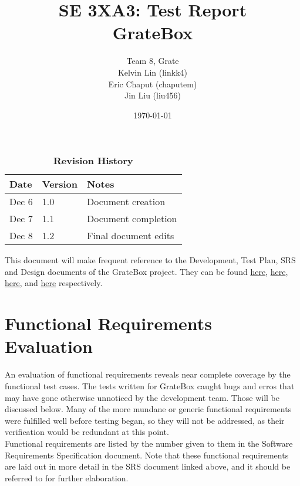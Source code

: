 \documentclass[12pt, titlepage]{article}
\title{SE 3XA3: Test Report\\GrateBox}
\author{Team 8, Grate
		\\ Kelvin Lin (linkk4)
		\\ Eric Chaput (chaputem)
		\\ Jin Liu (liu456)
}
\date{\today}
\begin{document}
\maketitle

\tableofcontents
\listoftables
\listoffigures

\begin{table}[h]
\caption{\bf Revision History}
\begin{tabularx}{\textwidth}{p{3cm}p{2cm}X}
\toprule {\bf Date} & {\bf Version} & {\bf Notes}\\
\midrule
Dec 6 & 1.0 & Document creation\\
Dec 7 & 1.1 & Document completion\\
Dec 8 & 1.2 & Final document edits\\
\bottomrule
\end{tabularx}
\end{table}

\newpage


This document will make frequent reference to the Development, Test Plan, SRS 
and Design documents of the GrateBox project. They can be found 
\href{https://gitlab.cas.mcmaster.ca/linkk4/GrateBox/tree/master/Doc/DevelopmentPlan}{here}, 
\href{https://gitlab.cas.mcmaster.ca/linkk4/GrateBox/tree/master/Doc/TestPlan}{here}, 
\href{https://gitlab.cas.mcmaster.ca/linkk4/GrateBox/tree/master/Doc/SRS}{here}, 
and 
\href{https://gitlab.cas.mcmaster.ca/linkk4/GrateBox/tree/master/Doc/Design}{here} 
respectively.

\section{Functional Requirements Evaluation}

An evaluation of functional requirements reveals near complete coverage by the functional test cases. The tests written for GrateBox caught bugs and erros that may have gone otherwise unnoticed by the development team. Those will be discussed below. Many of the more mundane or generic functional requirements were fulfilled well before testing began, so they will not be addressed, as their verification would be redundant at this point. \\

Functional requirements are listed by the number given to them in the Software Requirements Specification document. Note that these functional requirements are laid out in more detail in the SRS document linked above, and it should be referred to for further elaboration.\\
\end{document}
